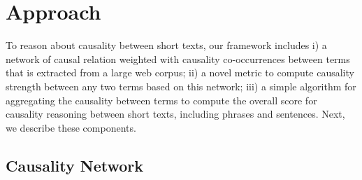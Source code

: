 \section{Approach}
\label{sec:approach}

%
%

To reason about causality between short texts,
our framework includes i) a network of causal relation weighted with
causality co-occurrences between terms that is extracted from
a large web corpus; ii) a novel metric to compute causality strength
 between any two terms based on this network; iii)
a simple algorithm for aggregating the causality between terms to
compute the overall score for causality reasoning between short texts,
including phrases and sentences.
Next, we describe these components.

%

\subsection{Causality Network}
\label{sec:network}


